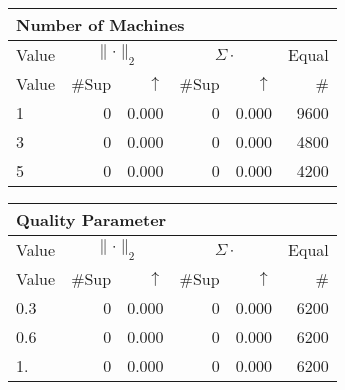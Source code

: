 \begin{center}
\renewcommand{\tabcolsep}{4pt}
\renewcommand{\arraystretch}{1.1}
\begin{customnormal}
\begin{tabular}{lrrrrr}
\multicolumn{6}{l}{Number of Machines}\\
\toprule
\multicolumn{1}{c}{Value} & \multicolumn{2}{c}{$\lVert \cdot \rVert_2$} & \multicolumn{2}{c}{$\Sigma \cdot$} & \multicolumn{1}{c}{Equal} \\ 
\cmidrule(lr){1-1} \cmidrule(lr){2-3} \cmidrule(lr){4-5}  \cmidrule(lr){6-6}
Value & \#Sup & $\uparrow$ & \#Sup & $\uparrow$ & \# \\ 
\midrule
1 & 0 & 0.000 & 0 & 0.000 & 9600 \\ 
3 & 0 & 0.000 & 0 & 0.000 & 4800 \\ 
5 & 0 & 0.000 & 0 & 0.000 & 4200 \\ 
\bottomrule
\end{tabular}


\end{customnormal}
\end{center}
\begin{center}
\renewcommand{\tabcolsep}{4pt}
\renewcommand{\arraystretch}{1.1}
\begin{customnormal}
\begin{tabular}{lrrrrr}
\multicolumn{6}{l}{Quality Parameter}\\
\toprule
\multicolumn{1}{c}{Value} & \multicolumn{2}{c}{$\lVert \cdot \rVert_2$} & \multicolumn{2}{c}{$\Sigma \cdot$} & \multicolumn{1}{c}{Equal} \\ 
\cmidrule(lr){1-1} \cmidrule(lr){2-3} \cmidrule(lr){4-5}  \cmidrule(lr){6-6}
Value & \#Sup & $\uparrow$ & \#Sup & $\uparrow$ & \# \\ 
\midrule
0.3 & 0 & 0.000 & 0 & 0.000 & 6200 \\ 
0.6 & 0 & 0.000 & 0 & 0.000 & 6200 \\ 
1. & 0 & 0.000 & 0 & 0.000 & 6200 \\ 
\bottomrule
\end{tabular}


\end{customnormal}
\end{center}
